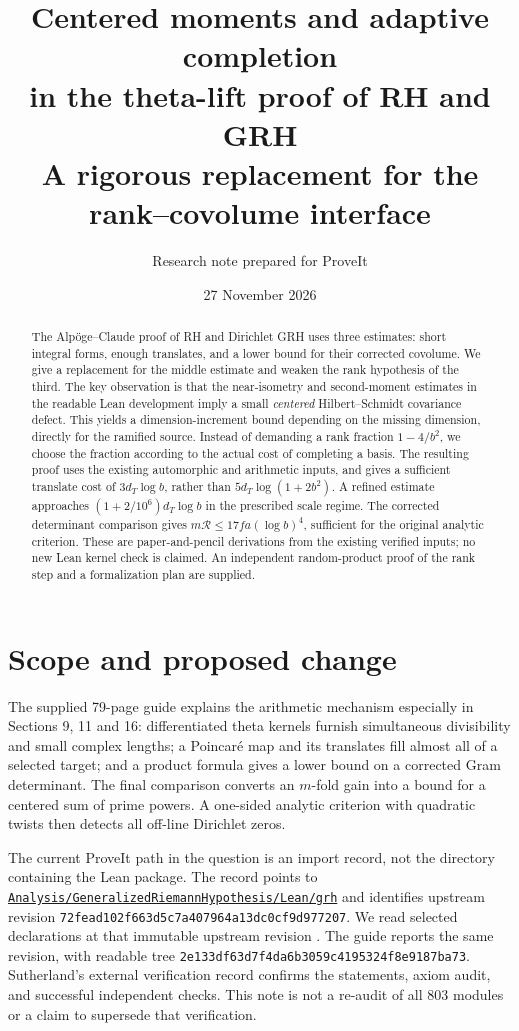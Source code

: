\documentclass[11pt]{article}
\title{\vspace{-1.2cm}\textcolor{ink}{\bfseries Centered moments and adaptive completion\\in the theta-lift proof of RH and GRH}\\[5pt]\large A rigorous replacement for the rank--covolume interface}
\author{Research note prepared for ProveIt}
\date{27 November 2026}
\theoremstyle{remark}\newtheorem{remark}[theorem]{Remark}
\newcommand{\R}{\mathcal R}
\begin{document}
\maketitle
\begin{abstract}
The Alp\"oge--Claude proof of RH and Dirichlet GRH uses three estimates: short integral forms, enough translates, and a lower bound for their corrected covolume. We give a replacement for the middle estimate and weaken the rank hypothesis of the third. The key observation is that the near-isometry and second-moment estimates in the readable Lean development imply a small \emph{centered} Hilbert--Schmidt covariance defect. This yields a dimension-increment bound depending on the missing dimension, directly for the ramified source. Instead of demanding a rank fraction $1-4/b^2$, we choose the fraction according to the actual cost of completing a basis. The resulting proof uses the existing automorphic and arithmetic inputs, and gives a sufficient translate cost of $3d_T\log b$, rather than $5d_T\log(1+2b^2)$. A refined estimate approaches $(1+2/10^6)d_T\log b$ in the prescribed scale regime. The corrected determinant comparison gives $m\R\le17fa(\log b)^4$, sufficient for the original analytic criterion. These are paper-and-pencil derivations from the existing verified inputs; no new Lean kernel check is claimed. An independent random-product proof of the rank step and a formalization plan are supplied.
\end{abstract}
\setcounter{tocdepth}{1}\tableofcontents
\newpage
\section{Scope and proposed change}
The supplied 79-page guide \cite{guide} explains the arithmetic mechanism especially in Sections 9, 11 and 16: differentiated theta kernels furnish simultaneous divisibility and small complex lengths; a Poincar\'e map and its translates fill almost all of a selected target; and a product formula gives a lower bound on a corrected Gram determinant. The final comparison converts an $m$-fold gain into a bound for a centered sum of prime powers. A one-sided analytic criterion with quadratic twists then detects all off-line Dirichlet zeros.

The current ProveIt path in the question is an import record, not the directory containing the Lean package. The record points to \href{https://github.com/VladimirReshetnikov/ProveIt/tree/main/Analysis/GeneralizedRiemannHypothesis/Lean/grh}{\texttt{Analysis/GeneralizedRiemannHypothesis/Lean/grh}} and identifies upstream revision \texttt{72fead102f663d5c7a407964a13dc0cf9d977207}. We read selected declarations at that immutable upstream revision \cite{lean}. The guide reports the same revision, with readable tree \texttt{2e133df63d7f4da6b3059c4195324f8e9187ba73}. Sutherland's external verification record \cite{verify} confirms the statements, axiom audit, and successful independent checks. This note is not a re-audit of all 803 modules or a claim to supersede that verification.
\end{document}
